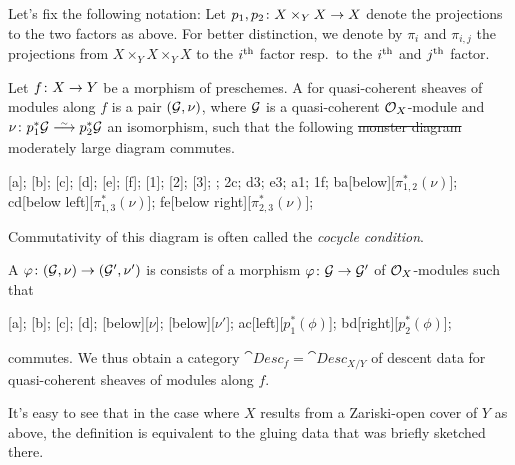 \documentclass[a4paper,parskip=half,numbers=enddot, DIV=12]{scrreprt}
\begin{document}
Let's fix the following notation: Let $p_1,p_2\colon X\times_YX\morphism X$ denote the projections to the two factors as above. For better distinction, we denote by $\pi_i$ and $\pi_{i,j}$ the projections from $X\times_YX\times_YX$ to the $i^{\text{th}}$ factor resp.\ to the $i^{\text{th}}$ and $j^{\text{th}}$ factor.
\begin{defi}
	Let $f\colon X\morphism Y$ be a morphism of preschemes. A  for quasi-coherent sheaves of modules along $f$ is a pair $(\mathcal{G},\nu)$, where $\mathcal{G}$ is a quasi-coherent $\mathcal{O}_X$-module and $\nu\colon  p_1^*\Gg\isomorphism p_2^*\Gg$ an isomorphism, such that the following \sout{monster diagram} moderately large diagram commutes.
	\begin{diagram*}
		[a];
		[b];
		[c];
		[d];
		[e];
		[f];
		[1];
		[2];
		[3];
		\scriptsize
		;
		\isoarrow2c;
		\isoarrow d3;
		\isoarrow e3;
		\isoarrow a1;
		\isoarrow 1f;
		\isoarrow ba[below][$ \pi_{1,2}^*(\nu)$];
		\isoarrow cd[below left][$ \pi_{1,3}^*(\nu)$];
		\isoarrow fe[below right][$ \pi_{2,3}^*(\nu)$];
	\end{diagram*}
	Commutativity of this diagram is often called the \emph{cocycle condition}.
	
	A  $\phi\colon (\Gg,\nu)\morphism(\Gg',\nu')$ is consists of a morphism $\phi\colon \Gg\morphism\Gg'$ of $\mathcal{O}_X$-modules such that
	\begin{diagram*}
		\object{0,1.5}{$ p_1^*\Gg$}[a];
		\object{2.5,1.5}{$ p_2^*\Gg$}[b];
		\object{0,0}{$ p_1^*\Gg'$}[c];
		\object{2.5,0}{$ p_2^*\Gg'$}[d];
		\scriptsize
		[below][$\nu$];
		[below][$\nu'$];
		\arrow ac[left][$ p_1^*(\phi)$];
		\arrow bd[right][$ p_2^*(\phi)$];
	\end{diagram*}
	commutes. We thus obtain a category $\cat{Desc}_f=\cat{Desc}_{X/Y}$ of descent data for quasi-coherent sheaves of modules along $f$.
\end{defi}
\begin{rem}
	It's easy to see that in the case where $X$ results from a Zariski-open cover of $Y$ as above, the definition is equivalent to the gluing data that was briefly sketched there.
\end{rem}
\end{document}
